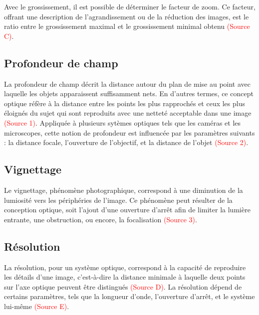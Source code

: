 \documentclass[11pt,letterpaper]{article}
\begin{document}
Avec le grossissement, il est possible de déterminer le facteur de zoom. Ce facteur, offrant une description de l'agrandissement ou de la réduction des images, est le ratio entre le grossissement maximal et le grossissement minimal obtenu \textcolor{red}{(Source C)}.



\subsection{Profondeur de champ}
La profondeur de champ décrit la distance autour du plan de mise au point avec laquelle les objets apparaissent suffisamment nets. En d'autres termes, ce concept optique réfère à la distance entre les points les plus rapprochés et ceux les plus éloignés du sujet qui sont reproduits avec une netteté acceptable dans une image \textcolor{red}{(Source 1)}. Appliquée à plusieurs sytèmes optiques tels que les caméras et les microscopes, cette notion de profondeur est influencée par les paramètres suivants : la distance focale, l'ouverture de l'objectif, et la distance de l'objet \textcolor{red}{(Source 2)}. 



\subsection{Vignettage}
Le vignettage, phénomène photographique, correspond à une diminution de la lumiosité vers les périphéries de l'image. Ce phénomène peut résulter de la conception optique, soit l'ajout d'une ouverture d'arrêt afin de limiter la lumière entrante, une obstruction, ou encore, la focalisation \textcolor{red}{(Source 3)}.


\subsection{Résolution}
La résolution, pour un système optique, correspond à la capacité de reproduire les détails d'une image, c'est-à-dire la distance minimale à laquelle deux points sur l'axe optique peuvent être distingués \textcolor{red}{(Source D)}. La résolution dépend de certains paramètres, tels que la longueur d'onde, l'ouverture d'arrêt, et le système lui-même \textcolor{red}{(Source E)}. 
\end{document}
